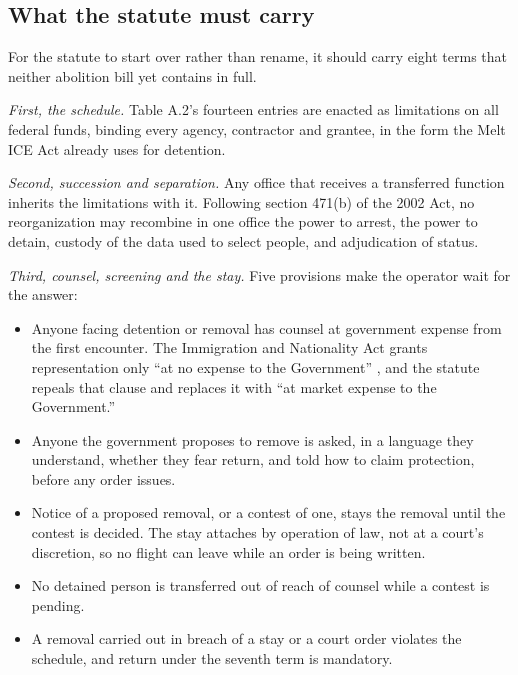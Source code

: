 \subsection{What the statute must carry}
\label{sec:11.4.3}
For the statute to start over rather than rename, it should carry eight terms that neither abolition bill yet contains in full.

\emph{First, the schedule.} Table A.2's fourteen entries are enacted as limitations on all federal funds, binding every agency, contractor and grantee, in the form the Melt ICE Act already uses for detention.

\emph{Second, succession and separation.} Any office that receives a transferred function inherits the limitations with it. Following section 471(b) of the 2002 Act, no reorganization may recombine in one office the power to arrest, the power to detain, custody of the data used to select people, and adjudication of status.

\emph{Third, counsel, screening and the stay.} Five provisions make the operator wait for the answer:

\begin{itemize}
\item Anyone facing detention or removal has counsel at government expense from the first encounter. The Immigration and Nationality Act grants representation only “at no expense to the Government” \autocite{usc1362}, and the statute repeals that clause and replaces it with “at market expense to the Government.”
\item Anyone the government proposes to remove is asked, in a language they understand, whether they fear return, and told how to claim protection, before any order issues.
\item Notice of a proposed removal, or a contest of one, stays the removal until the contest is decided. The stay attaches by operation of law, not at a court's discretion, so no flight can leave while an order is being written.
\item No detained person is transferred out of reach of counsel while a contest is pending.
\item A removal carried out in breach of a stay or a court order violates the schedule, and return under the seventh term is mandatory.
\end{itemize}

